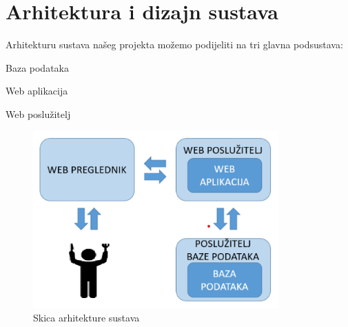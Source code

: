 \chapter{Arhitektura i dizajn sustava}

	
	Arhitekturu sustava našeg projekta možemo podijeliti na tri glavna podsustava:
	
	\begin{packed_enum}
	
		\item Baza podataka
		\item Web aplikacija
		\item Web poslužitelj
		
	
	\begin{figure}[H]
			\includegraphics[scale=0.8]{slike/Arhitektura.png} %
			\centering
			\caption{Skica arhitekture sustava}
			\label{fig:ARH}
		\end{figure}
		
		
							
	\end{packed_enum}
	
